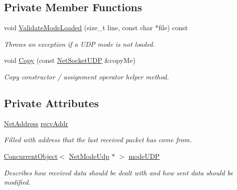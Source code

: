 \subsection*{Private Member Functions}
\begin{DoxyCompactItemize}
\item 
void \hyperlink{class_net_socket_u_d_p_a26c009b5e9d6c50715a46e368b36dc2f}{ValidateModeLoaded} (size\_\-t line, const char $\ast$file) const 
\begin{DoxyCompactList}\small\item\em Throws an exception if a UDP mode is not loaded. \item\end{DoxyCompactList}\item 
void \hyperlink{class_net_socket_u_d_p_a34b0dc8953b74caaaded5c3cea22f334}{Copy} (const \hyperlink{class_net_socket_u_d_p}{NetSocketUDP} \&copyMe)
\begin{DoxyCompactList}\small\item\em Copy constructor / assignment operator helper method. \item\end{DoxyCompactList}\end{DoxyCompactItemize}
\subsection*{Private Attributes}
\begin{DoxyCompactItemize}
\item 
\hypertarget{class_net_socket_u_d_p_ab0fe52f5f72fdceb442d4a06e3944c45}{
\hyperlink{class_net_address}{NetAddress} \hyperlink{class_net_socket_u_d_p_ab0fe52f5f72fdceb442d4a06e3944c45}{recvAddr}}
\label{class_net_socket_u_d_p_ab0fe52f5f72fdceb442d4a06e3944c45}

\begin{DoxyCompactList}\small\item\em Filled with address that the last received packet has come from. \item\end{DoxyCompactList}\item 
\hyperlink{class_concurrent_object}{ConcurrentObject}$<$ \hyperlink{class_net_mode_udp}{NetModeUdp} $\ast$ $>$ \hyperlink{class_net_socket_u_d_p_a7b3a3c5ab9bb5b78f66fe5fe50164df1}{modeUDP}
\begin{DoxyCompactList}\small\item\em Describes how received data should be dealt with and how sent data should be modified. \item\end{DoxyCompactList}\end{DoxyCompactItemize}


